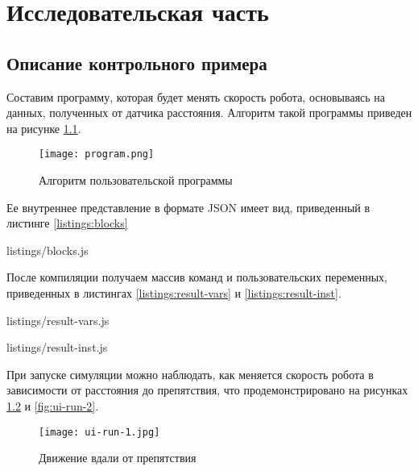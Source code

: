 \chapter{Исследовательская часть}

\section{Описание контрольного примера}

Составим программу, которая будет менять скорость робота, основываясь на данных, полученных от датчика расстояния. Алгоритм такой программы приведен на рисунке \ref{fig:program}.

\begin{figure}[htbp]
	\centering
	\texttt{[image: program.png]}
	\caption{Алгоритм пользовательской программы}%
	\label{fig:program}
\end{figure}

Ее внутреннее представление в формате JSON имеет вид, приведенный в листинге \ref{listings:blocks}


{listings/blocks.js}

После компиляции получаем массив команд и пользовательских переменных, приведенных в листингах \ref{listings:result-vars} и \ref{listings:result-inst}.


{listings/result-vars.js}


{listings/result-inst.js}

При запуске симуляции можно наблюдать, как меняется скорость робота в зависимости от расстояния до препятствия, что продемонстрировано на рисунках \ref{fig:ui-run-1} и \ref{fig:ui-run-2}.

\begin{figure}[htbp]
	\centering
	\texttt{[image: ui-run-1.jpg]}
	\caption{Движение вдали от препятствия}%
	\label{fig:ui-run-1}
\end{figure}

